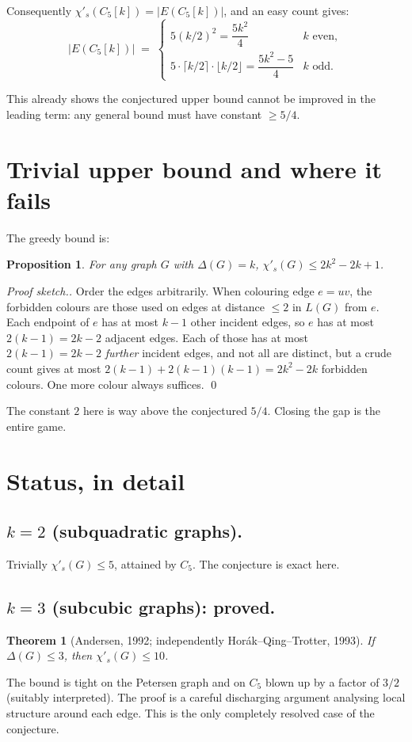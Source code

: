 \documentclass[11pt]{article}
\newcommand{\sci}{\chi'_s}
\newtheorem*{theorem*}{Theorem}
\newtheorem*{prop*}{Proposition}
\begin{document}
Consequently $\sci(C_5[k]) = |E(C_5[k])|$, and an easy count gives:
\[
|E(C_5[k])| \;=\;
\begin{cases}
5 (k/2)^2 = \dfrac{5k^2}{4} & k \text{ even}, \\[4pt]
5 \cdot \lceil k/2 \rceil \cdot \lfloor k/2 \rfloor = \dfrac{5k^2-5}{4}
  & k \text{ odd}.
\end{cases}
\]

This already shows the conjectured upper bound cannot be improved
in the leading term: any general bound must have constant
$\geq 5/4$.

\section*{Trivial upper bound and where it fails}

The greedy bound is:

\begin{prop*}
For any graph $G$ with $\Delta(G) = k$, $\sci(G) \leq 2k^2 - 2k + 1$.
\end{prop*}

\begin{proof}[Proof sketch.]
Order the edges arbitrarily. When colouring edge $e = uv$, the
forbidden colours are those used on edges at distance $\leq 2$ in
$L(G)$ from $e$. Each endpoint of $e$ has at most $k-1$ other
incident edges, so $e$ has at most $2(k-1) = 2k-2$ adjacent edges.
Each of those has at most $2(k-1) = 2k-2$ \emph{further} incident
edges, and not all are distinct, but a crude count gives at most
$2(k-1) + 2(k-1)(k-1) = 2k^2 - 2k$ forbidden colours. One more
colour always suffices. \qed
\end{proof}

The constant $2$ here is way above the conjectured $5/4$. Closing
the gap is the entire game.

\section*{Status, in detail}

\subsection*{$k = 2$ (subquadratic graphs).}
Trivially $\sci(G) \leq 5$, attained by $C_5$. The conjecture is
exact here.

\subsection*{$k = 3$ (subcubic graphs): proved.}
\begin{theorem*}[Andersen, 1992; independently Hor\'ak--Qing--Trotter, 1993]
If $\Delta(G) \leq 3$, then $\sci(G) \leq 10$.
\end{theorem*}
The bound is tight on the Petersen graph and on $C_5$ blown up by a
factor of $3/2$ (suitably interpreted). The proof is a careful
discharging argument analysing local structure around each edge.
This is the only completely resolved case of the conjecture.
\end{document}
